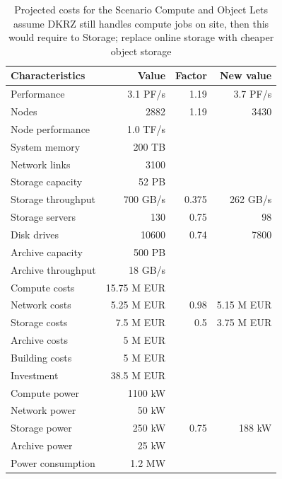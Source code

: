 \documentclass{../../template/esiwace-report}
\begin{document}
\begin{table}
\centering
\begin{tabular}{|l|r|r|r|}
	\hline
	Characteristics    &       Value & Factor &  New value \\ \hline
	Performance        &    3.1 PF/s &   1.19 &   3.7 PF/s \\
	Nodes              &        2882 &   1.19 &       3430 \\
	Node performance   &    1.0 TF/s &        &  \\
	System memory      &      200 TB &        &  \\
	Network links      &        3100 &        &  \\ \hline
	Storage	capacity   &       52 PB &        &  \\
	Storage	throughput &    700 GB/s &  0.375 &   262 GB/s \\
	Storage servers    &         130 &   0.75    &         98 \\
	Disk drives        &       10600 &   0.74  &       7800 \\ \hline
	Archive	capacity   &      500 PB &        &  \\
	Archive	throughput &     18 GB/s &        &  \\ \hline
	Compute costs      & 15.75 M EUR &        &  \\
	Network costs      &  5.25 M EUR &   0.98 & 5.15 M EUR \\
	Storage costs      &   7.5 M EUR &    0.5 & 3.75 M EUR \\
	Archive costs      &     5 M EUR &        &  \\
	Building costs     &     5 M EUR &        &  \\ \hline
	Investment         &  38.5 M EUR &        &  \\ \hline
	Compute power      &     1100 kW &        &  \\
	Network power      &       50 kW &        &  \\
	Storage power      &      250 kW &   0.75 &     188 kW \\
	Archive power      &       25 kW &        &  \\ \hline
	Power consumption  &      1.2 MW &        &  \\ \hline
\end{tabular}
\caption{Projected costs for the Scenario Compute and Object Lets assume DKRZ still handles compute jobs on site, then this would require to
	Storage; replace online storage with cheaper object storage}
\label{tbl:costs compute + objects + tape}
\end{table}
\end{document}
